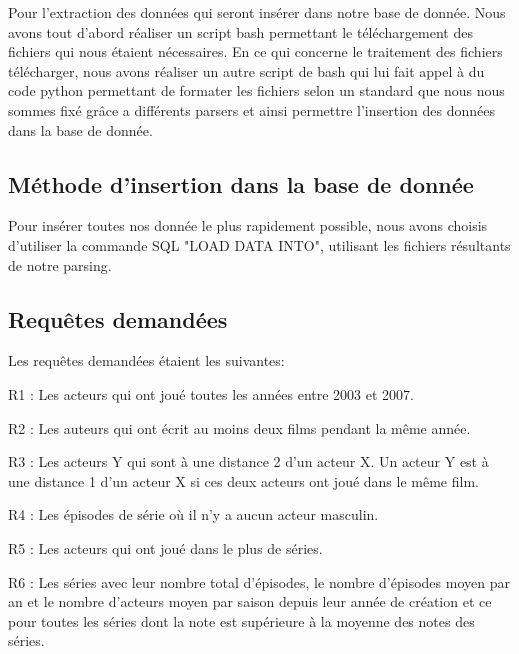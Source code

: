 \documentclass[10pt,a4paper]{article}
\begin{document}
Pour l'extraction des données qui seront insérer dans notre base de donnée. Nous avons tout d'abord réaliser un script bash permettant le téléchargement des fichiers qui nous étaient nécessaires. En ce qui concerne le traitement des fichiers télécharger, nous avons réaliser un autre script de bash qui lui fait appel à du code python permettant de formater les fichiers selon un standard que nous nous sommes fixé grâce a différents parsers et ainsi permettre l'insertion des données dans la base de donnée.

\subsection{Méthode d'insertion dans la base de donnée}

Pour insérer toutes nos donnée le plus rapidement possible, nous avons choisis d'utiliser la commande SQL "LOAD DATA INTO", utilisant les fichiers résultants de notre parsing.


\subsection{Requêtes demandées}
Les requêtes demandées étaient les suivantes:
\begin{list}{-}{}
  \item R1 : Les acteurs qui ont joué toutes les années entre 2003 et
    2007.
  \item R2 : Les auteurs qui ont écrit au moins deux films pendant la
    même année.
  \item R3 : Les acteurs Y qui sont à une distance 2 d'un acteur X. Un
    acteur Y est à une distance 1 d'un acteur X si ces deux acteurs
    ont joué dans le même film.
  \item R4 : Les épisodes de série où il n'y a aucun acteur masculin.
  \item R5 : Les acteurs qui ont joué dans le plus de séries.
  \item R6 : Les séries avec leur nombre total d'épisodes, le nombre
    d'épisodes moyen par an et le nombre d'acteurs moyen par saison
    depuis leur année de création et ce pour toutes les séries dont la
    note est supérieure à la moyenne des notes des séries.
\end{list}
\end{document}
